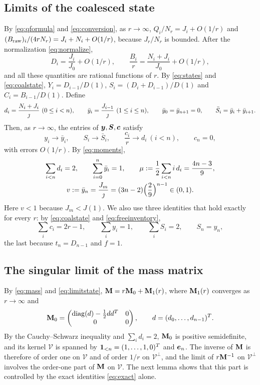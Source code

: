 \subsection{Limits of the coalesced state}
By \eqref{eq:qformula} and \eqref{eq:conversion}, as \(r\to\infty\),
\(Q_i/N_r=J_i+O(1/r)\) and \((B_{\mathrm{raw}})_i/(4rN_r)=J_i+N_i+O(1/r)\), because \(J_r/N_r\) is
bounded. After the normalization \eqref{eq:normalize},
\[
 D_i=\frac{J_i}{J_0}+O(1/r),\qquad \frac{B_i}{r}=\frac{N_i+J_i}{J_0}+O(1/r),
\]
and all these quantities are rational functions of \(r\). By \eqref{eq:states} and
\eqref{eq:coalstate}, \(Y_i=D_{i-1}/D(1)\), \(S_i=(D_i+D_{i-1})/D(1)\) and \(C_i=B_{i-1}/D(1)\).
Define
\begin{equation}\label{eq:limits}
 d_i=\frac{N_i+J_i}{\jmath}\ (0\le i<n),\qquad
 \bar y_i=\frac{J_{i-1}}{\jmath}\ (1\le i\le n),\qquad \bar y_0=\bar y_{n+1}=0,\qquad
 \bar S_i=\bar y_i+\bar y_{i+1}.
\end{equation}
Then, as \(r\to\infty\), the entries of \(\boldsymbol y,\boldsymbol S,\boldsymbol c\) satisfy
\begin{equation}\label{eq:limitstate}
 y_i\to\bar y_i,\qquad S_i\to\bar S_i,\qquad \frac{c_i}{r}\to d_i\ (i<n),\qquad c_n=0,
\end{equation}
with errors \(O(1/r)\). By \eqref{eq:moments},
\begin{equation}\label{eq:vmu}
\begin{gathered}
 \sum_{i<n}d_i=2,\qquad \sum_{i=0}^n\bar y_i=1,\qquad
 \mu:=\frac12\sum_{i<n}i\,d_i=\frac{4n-3}{9},\\
 v:=\bar y_n=\frac{J_m}{\jmath}=(3n-2)\Bigl(\frac29\Bigr)^{n-1}\in(0,1).
\end{gathered}
\end{equation}
Here \(v<1\) because \(J_m<J(1)\). We also use three identities that hold exactly for every
\(r\): by \eqref{eq:coalstate} and \eqref{eq:freeinventory},
\begin{equation}\label{eq:exact}
 \sum_ic_i=2r-1,\qquad \sum_iy_i=1,\qquad \sum_iS_i=2,\qquad S_n=y_n ,
\end{equation}
the last because \(t_n=D_{n-1}\) and \(f=1\).

\subsection{The singular limit of the mass matrix}
By \eqref{eq:mass} and \eqref{eq:limitstate}, \(\mathbf M=r\mathbf M_0+\mathbf M_1(r)\), where \(\mathbf M_1(r)\)
converges as \(r\to\infty\) and
\[
 \mathbf M_0=\begin{pmatrix}\operatorname{diag}(d)-\tfrac12dd^{T}&0\\0&0\end{pmatrix},\qquad d=(d_0,\dots,d_{n-1})^{T}.
\]
By the Cauchy--Schwarz inequality and \(\sum_id_i=2\), \(\mathbf M_0\) is positive semidefinite, and
its kernel \(\mathcal V\) is spanned by \(\boldsymbol 1_{<n}=(1,\dots,1,0)^{T}\) and \(\boldsymbol e_n\). The
inverse of \(\mathbf M\) is therefore of order one on \(\mathcal V\) and of order \(1/r\) on
\(\mathcal V^{\perp}\), and the limit of \(r\mathbf M^{-1}\) on \(\mathcal V^\perp\) involves the
order-one part of \(\mathbf M\) on \(\mathcal V\). The next lemma shows that this part is controlled
by the exact identities \eqref{eq:exact} alone.

